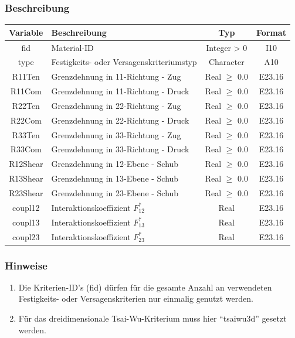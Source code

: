 \documentclass[11pt,titlepage,listof=totoc,bibliography=totoc,twoside]{scrreprt}
\begin{document}
{{\subsubsection{Beschreibung}

\begin{tabularx}{\textwidth}{cXcc}
\toprule
Variable	& Beschreibung														& Typ			& Format\\
\midrule
fid		& Material-ID														& Integer > 0		& I10	\\
type		& Festigkeits- oder Versagenskriteriumstyp										& Character		& A10	\\
R11Ten		& Grenzdehnung in 11-Richtung - Zug											& Real $\ge$ 0.0	& E23.16\\
R11Com		& Grenzdehnung in 11-Richtung - Druck											& Real $\ge$ 0.0	& E23.16\\
R22Ten		& Grenzdehnung in 22-Richtung - Zug											& Real $\ge$ 0.0	& E23.16\\
R22Com		& Grenzdehnung in 22-Richtung - Druck											& Real $\ge$ 0.0	& E23.16\\
R33Ten		& Grenzdehnung in 33-Richtung - Zug 											& Real $\ge$ 0.0	& E23.16\\
R33Com		& Grenzdehnung in 33-Richtung - Druck											& Real $\ge$ 0.0	& E23.16\\
R12Shear	& Grenzdehnung in 12-Ebene - Schub											& Real $\ge$ 0.0	& E23.16\\
R13Shear	& Grenzdehnung in 13-Ebene - Schub 											& Real $\ge$ 0.0	& E23.16\\
R23Shear	& Grenzdehnung in 23-Ebene - Schub											& Real $\ge$ 0.0	& E23.16\\
coupl12		& Interaktionskoeffizient $F_{12}^*$											& Real			& E23.16\\
coupl13		& Interaktionskoeffizient $F_{13}^*$											& Real			& E23.16\\
coupl23		& Interaktionskoeffizient $F_{23}^*$											& Real			& E23.16\\
\bottomrule
\end{tabularx}

\subsubsection{Hinweise}

\begin{enumerate}
\item Die Kriterien-ID's (fid) dürfen für die gesamte Anzahl an verwendeten Festigkeits- oder Versagenskriterien nur einmalig genutzt werden.
\item Für das dreidimensionale Tsai-Wu-Kriterium muss hier ``tsaiwu3d'' gesetzt werden.
\end{enumerate}

}}
\end{document}
